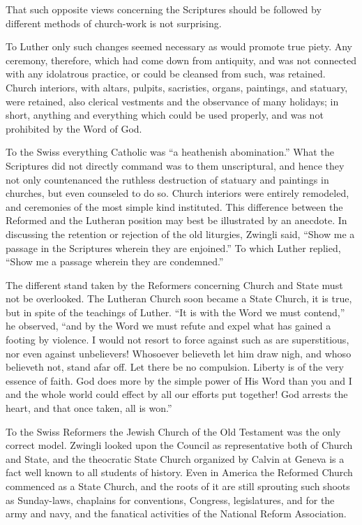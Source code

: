\documentclass[
]{book}
\begin{document}
That such opposite views concerning the Scriptures should be followed by different methods of church-work is not surprising.

To Luther only such changes seemed necessary as would promote true piety. Any ceremony, therefore, which had come down from antiquity, and was not connected with any idolatrous practice, or could be cleansed from such, was retained. Church interiors, with altars, pulpits, sacristies, organs, paintings, and statuary, were retained, also clerical vestments and the observance of many holidays; in short, anything and everything which could be used properly, and was not prohibited by the Word of God.

To the Swiss everything Catholic was ``a heathenish abomination.'' What the Scriptures did not directly command was to them unscriptural, and hence they not only countenanced the ruthless destruction of statuary and paintings in churches, but even counseled to do so. Church interiors were entirely remodeled, and ceremonies of the most simple kind instituted. This difference between the Reformed and the Lutheran position may best be illustrated by an anecdote. In discussing the retention or rejection of the old liturgies, Zwingli said, ``Show me a passage in the Scriptures wherein they are enjoined.'' To which Luther replied, ``Show me a passage wherein they are condemned.''

The different stand taken by the Reformers concerning Church and State must not be overlooked. The Lutheran Church soon became a State Church, it is true, but in spite of the teachings of Luther. ``It is with the Word we must contend,'' he observed, ``and by the Word we must refute and expel what has gained a footing by violence. I would not resort to force against such as are superstitious, nor even against unbelievers! Whosoever believeth let him draw nigh, and whoso believeth not, stand afar off. Let there be no compulsion. Liberty is of the very essence of faith. God does more by the simple power of His Word than you and I and the whole world could effect by all our efforts put together! God arrests the heart, and that once taken, all is won.''

To the Swiss Reformers the Jewish Church of the Old Testament was the only correct model. Zwingli looked upon the Council as representative both of Church and State, and the theocratic State Church organized by Calvin at Geneva is a fact well known to all students of history. Even in America the Reformed Church commenced as a State Church, and the roots of it are still sprouting such shoots as Sunday-laws, chaplains for conventions, Congress, legislatures, and for the army and navy, and the fanatical activities of the National Reform Association.
\end{document}
